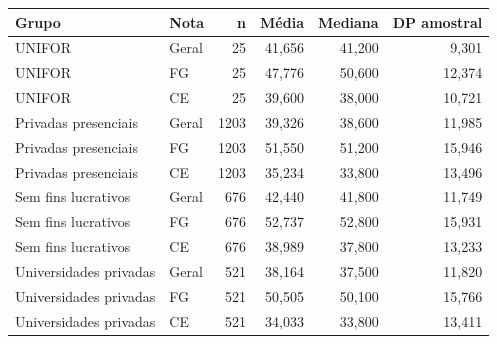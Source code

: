 \begin{tabular}{llrrrr}
\toprule
Grupo & Nota & n & Média & Mediana & DP amostral \\
\midrule
UNIFOR & Geral & 25 & 41,656 & 41,200 & 9,301 \\
UNIFOR & FG & 25 & 47,776 & 50,600 & 12,374 \\
UNIFOR & CE & 25 & 39,600 & 38,000 & 10,721 \\
Privadas presenciais & Geral & 1203 & 39,326 & 38,600 & 11,985 \\
Privadas presenciais & FG & 1203 & 51,550 & 51,200 & 15,946 \\
Privadas presenciais & CE & 1203 & 35,234 & 33,800 & 13,496 \\
Sem fins lucrativos & Geral & 676 & 42,440 & 41,800 & 11,749 \\
Sem fins lucrativos & FG & 676 & 52,737 & 52,800 & 15,931 \\
Sem fins lucrativos & CE & 676 & 38,989 & 37,800 & 13,233 \\
Universidades privadas & Geral & 521 & 38,164 & 37,500 & 11,820 \\
Universidades privadas & FG & 521 & 50,505 & 50,100 & 15,766 \\
Universidades privadas & CE & 521 & 34,033 & 33,800 & 13,411 \\
\bottomrule
\end{tabular}
